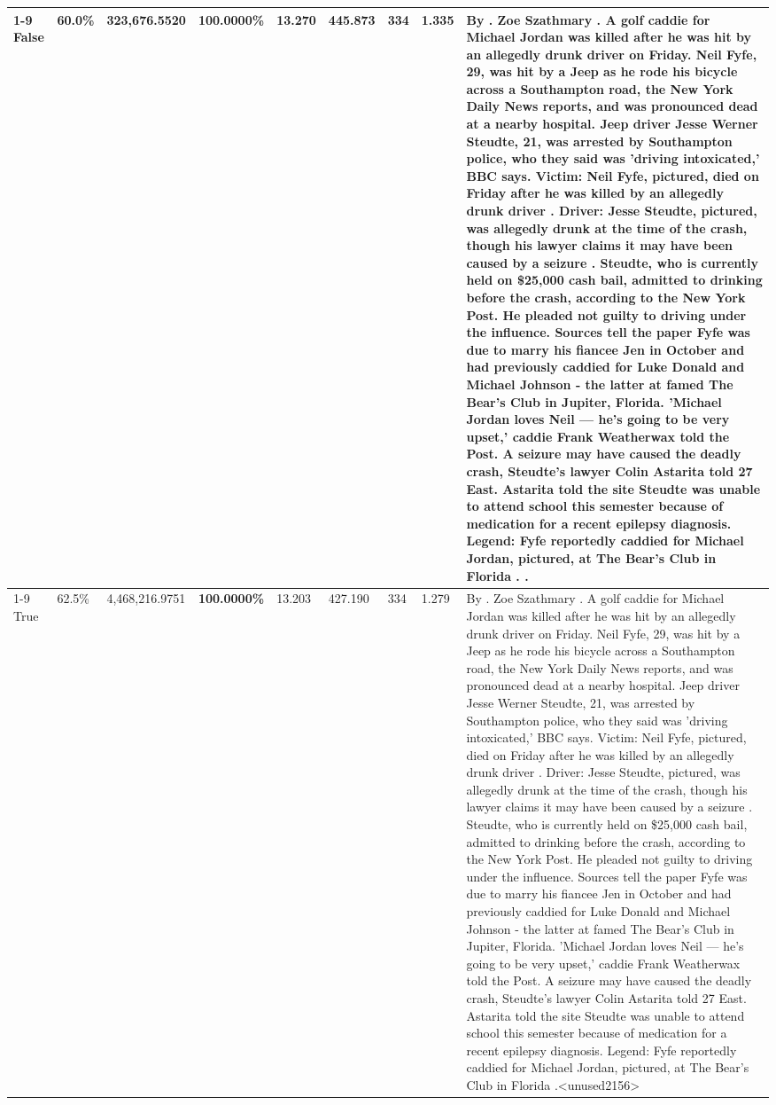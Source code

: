 \begin{table}[H]
\begin{tabular}{lllrlllll}
\cline{1-9}
False & 60.0\% & 323,676.5520 & \bfseries \color{red} 100.0000\% & 13.270 & 445.873 & 334 & 1.335 & By . Zoe Szathmary . A golf caddie for Michael Jordan was killed after he was hit by an allegedly drunk driver on Friday. Neil Fyfe, 29, was hit by a Jeep as he rode his bicycle across a Southampton road, the New York Daily News reports, and was pronounced dead at a nearby hospital. Jeep driver Jesse Werner Steudte, 21, was arrested by Southampton police, who they said was 'driving intoxicated,' BBC says. Victim: Neil Fyfe, pictured, died on Friday after he was killed by an allegedly drunk driver . Driver: Jesse Steudte, pictured, was allegedly drunk at the time of the crash, though his lawyer claims it may have been caused by a seizure . Steudte, who is currently held on \$25,000 cash bail, admitted to drinking before the crash, according to the New York Post. He pleaded not guilty to driving under the influence. Sources tell the paper Fyfe was due to marry his fiancee Jen in October and had previously caddied for Luke Donald and Michael Johnson - the latter at famed The Bear's Club in Jupiter, Florida. 'Michael Jordan loves Neil — he’s going to be very upset,' caddie Frank Weatherwax told the Post. A seizure may have caused the deadly crash, Steudte's lawyer Colin Astarita told 27 East. Astarita told the site Steudte was unable to attend school this semester because of medication for a recent epilepsy diagnosis. Legend: Fyfe reportedly caddied for Michael Jordan, pictured, at The Bear's Club in Florida . . \\
\cline{1-9}
True & 62.5\% & 4,468,216.9751 & \bfseries \color{red} 100.0000\% & 13.203 & 427.190 & 334 & 1.279 & By . Zoe Szathmary . A golf caddie for Michael Jordan was killed after he was hit by an allegedly drunk driver on Friday. Neil Fyfe, 29, was hit by a Jeep as he rode his bicycle across a Southampton road, the New York Daily News reports, and was pronounced dead at a nearby hospital. Jeep driver Jesse Werner Steudte, 21, was arrested by Southampton police, who they said was 'driving intoxicated,' BBC says. Victim: Neil Fyfe, pictured, died on Friday after he was killed by an allegedly drunk driver . Driver: Jesse Steudte, pictured, was allegedly drunk at the time of the crash, though his lawyer claims it may have been caused by a seizure . Steudte, who is currently held on \$25,000 cash bail, admitted to drinking before the crash, according to the New York Post. He pleaded not guilty to driving under the influence. Sources tell the paper Fyfe was due to marry his fiancee Jen in October and had previously caddied for Luke Donald and Michael Johnson - the latter at famed The Bear's Club in Jupiter, Florida. 'Michael Jordan loves Neil — he’s going to be very upset,' caddie Frank Weatherwax told the Post. A seizure may have caused the deadly crash, Steudte's lawyer Colin Astarita told 27 East. Astarita told the site Steudte was unable to attend school this semester because of medication for a recent epilepsy diagnosis. Legend: Fyfe reportedly caddied for Michael Jordan, pictured, at The Bear's Club in Florida .<unused2156> \\

\end{tabular}
\end{table}
